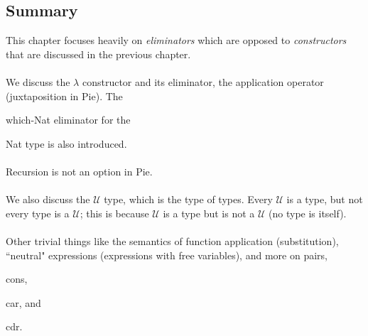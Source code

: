 \documentclass{article}
\newcommand*{\SavedLstInline}{}
\DeclareRobustCommand*{\lstinline}{%
  \ifmmode
    \let\SavedBGroup\bgroup
    \def\bgroup{%
      \let\bgroup\SavedBGroup
      \hbox\bgroup
    }%
  \fi
  \SavedLstInline
}
\begin{document}
\subsection{Summary}
This chapter focuses heavily on \textit{eliminators} which are opposed to \textit{constructors} that are discussed in the previous chapter.
\\ \\
We discuss the \(\lambda\) constructor and its eliminator, the application operator (juxtaposition in Pie). The \lstinline{which-Nat} eliminator for the \lstinline{Nat} type is also introduced.
\\ \\
Recursion is not an option in Pie.
\\ \\
We also discuss the \(\mathcal{U}\) type, which is the type of types. Every \(\mathcal{U}\) is a type, but not every type is a \(\mathcal{U}\); this is because \(\mathcal{U}\) is a type but is not a \(\mathcal{U}\) (no type is itself).
\\ \\
Other trivial things like the semantics of function application (substitution), ``neutral" expressions (expressions with free variables), and more on pairs, \lstinline{cons}, \lstinline{car}, and \lstinline{cdr}.
\end{document}
